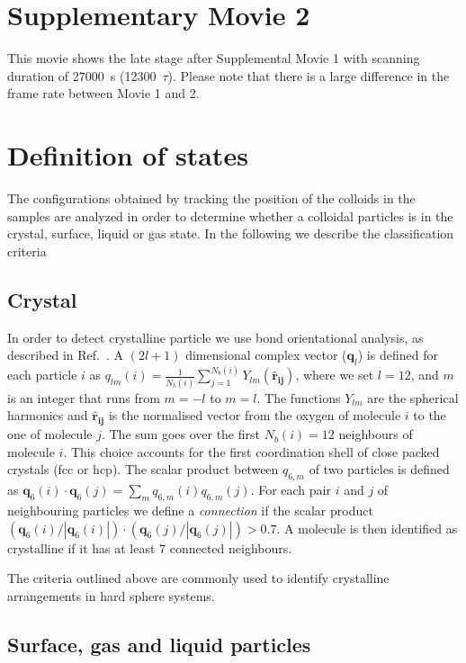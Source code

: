 \section*{Supplementary Movie 2}
This movie shows the late stage after Supplemental Movie 1 with scanning duration of 27000~s (12300~$\tau$). 
Please note that there is a large difference in the frame rate between Movie 1 and 2. 

\section*{Definition of states}
The configurations obtained by tracking the position of the colloids in the samples
are analyzed in order to determine whether a colloidal particles is in the
crystal, surface, liquid or gas state. In the following we describe the classification
criteria

\subsection*{Crystal}
In order to detect crystalline particle we use bond orientational analysis,
as described in Ref.~\cite{russo2013interplay}.
A $(2l+1)$ dimensional complex vector ($\mathbf{q}_l$) is defined for each
particle $i$ as $q_{lm}(i)=\frac{1}{N_b(i)}\sum_{j=1}^{N_b(i)}
Y_{lm}(\mathbf{\hat{r}_{ij}})$, where we set $l=12$, and $m$ is an integer that
runs from $m=-l$ to $m=l$. The functions $Y_{lm}$ are the spherical harmonics
and $\mathbf{\hat{r}_{ij}}$ is the normalised vector from the oxygen of
molecule $i$ to the one of molecule $j$.  The sum goes over the first
$N_b(i)=12$ neighbours of molecule $i$. This choice accounts for
the first coordination shell of close packed crystals (fcc or hcp).
The scalar product between $q_{6,m}$ of two particles
is defined as $\mathbf{q}_{6}(i)\cdot\mathbf{q}_{6}(j)=\sum_m q_{6,m}(i)q_{6,m}(j)$.
For each pair $i$ and $j$ of neighbouring particles we define a \emph{connection}
if the scalar product $(\mathbf{q}_{6}(i)/|\mathbf{q}_{6}(i)|)\cdot(\mathbf{q}_{6}(j)/|\mathbf{q}_{6}(j)|)>0.7$.
A molecule is then identified as crystalline if it has at least $7$ connected neighbours.

The criteria outlined above are commonly used to identify crystalline arrangements in hard sphere systems.

\subsection*{Surface, gas and liquid particles}

